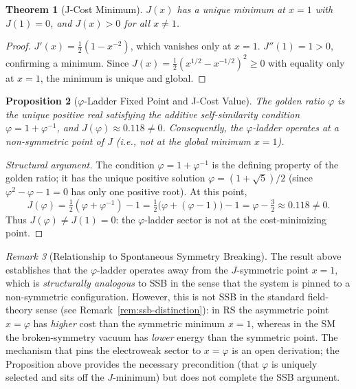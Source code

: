 \documentclass[12pt,a4paper]{article}
\newtheorem{theorem}{Theorem}[section]
\newtheorem{proposition}[theorem]{Proposition}
\theoremstyle{definition}
\theoremstyle{remark}
\newtheorem{remark}[theorem]{Remark}
\begin{document}
\begin{theorem}[J-Cost Minimum]
\label{thm:minimum}
$J(x)$ has a unique minimum at $x = 1$ with $J(1) = 0$, and
$J(x) > 0$ for all $x \neq 1$.
\end{theorem}

\begin{proof}
$J'(x) = \tfrac{1}{2}(1 - x^{-2})$, which vanishes only at
$x = 1$.  $J''(1) = 1 > 0$, confirming a minimum.  Since
$J(x) = \tfrac{1}{2}(x^{1/2} - x^{-1/2})^2 \geq 0$ with
equality only at $x = 1$, the minimum is unique and global.
\end{proof}

\begin{proposition}[$\varphi$-Ladder Fixed Point and J-Cost Value]
\label{thm:ssb}
The golden ratio $\varphi$ is the unique positive real satisfying the
additive self-similarity condition $\varphi = 1 + \varphi^{-1}$,
and $J(\varphi) \approx 0.118 \neq 0$.  Consequently, the
$\varphi$-ladder operates at a non-symmetric point of $J$
(i.e., not at the global minimum $x = 1$).
\end{proposition}

\begin{proof}[Structural argument]
The condition $\varphi = 1 + \varphi^{-1}$ is the defining property of
the golden ratio; it has the unique positive solution
$\varphi = (1+\sqrt{5})/2$ (since $\varphi^2 - \varphi - 1 = 0$ has
only one positive root).
At this point,
\[
  J(\varphi) = \tfrac{1}{2}(\varphi + \varphi^{-1}) - 1
  = \tfrac{1}{2}\bigl(\varphi + (\varphi - 1)\bigr) - 1
  = \varphi - \tfrac{3}{2} \approx 0.118 \neq 0.
\]
Thus $J(\varphi) \neq J(1) = 0$: the $\varphi$-ladder sector is not at
the cost-minimizing point.
\end{proof}

\begin{remark}[Relationship to Spontaneous Symmetry Breaking]
The result above establishes that the $\varphi$-ladder operates away
from the $J$-symmetric point $x = 1$, which is \emph{structurally
analogous} to SSB in the sense that the system is pinned to a
non-symmetric configuration.  However, this is not SSB in the
standard field-theory sense (see Remark~\ref{rem:ssb-distinction}):
in RS the asymmetric point $x = \varphi$ has \emph{higher} cost
than the symmetric minimum $x = 1$, whereas in the SM the broken-symmetry
vacuum has \emph{lower} energy than the symmetric point.
The mechanism that pins the electroweak sector to $x = \varphi$ is an
open derivation; the Proposition above provides the necessary
precondition (that $\varphi$ is uniquely selected and sits off the
$J$-minimum) but does not complete the SSB argument.
\end{remark}
\end{document}
